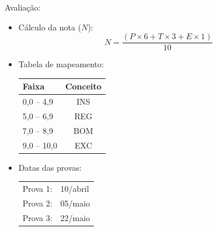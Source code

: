       \begin{slide}[toc=]{Avaliação:}
         \begin{itemize}
        \item Cálculo da nota ($N$):
            \begin{equation*}
	    N=\frac{( P \times 6 + T \times 3 + E \times 1 )} {10}
            \end{equation*}
          \item Tabela de mapeamento:
            \begin{table}
               \centering
               \begin{tabular}{lc}
                  \hline
                  \textbf{Faixa} & \textbf{Conceito}\\
                  \hline
                  0,0 -- 4,9 & INS\\
                  5,0 -- 6,9 & REG\\
                  7,0 -- 8,9 & BOM\\
                  9,0 -- 10,0 & EXC\\
                  \hline
               \end{tabular}
            \end{table}
      \item Datas das provas:
            \begin{table}
               \centering
               \begin{tabular}{|l l|}
                  \hline
                  Prova 1: & 10/abril\\
                  Prova 2: & 05/maio\\
                  Prova 3: & 22/maio\\
                  \hline
               \end{tabular}
            \end{table}
         \end{itemize}
      \end{slide}

